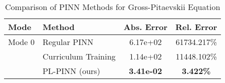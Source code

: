 \begin{table}[htbp]
\centering
\caption{Comparison of PINN Methods for Gross-Pitaevskii Equation}
\label{tab:pinn_comparison}
\begin{tabular}{llcc}
\toprule
Mode & Method & Abs. Error & Rel. Error \\
\midrule
Mode 0 & Regular PINN & 6.17e+02 & 61734.217\% \\
 & Curriculum Training & 1.14e+02 & 11448.102\% \\
 & PL-PINN (ours) & \textbf{3.41e-02} & \textbf{3.422\%} \\
\bottomrule
\end{tabular}
\end{table}